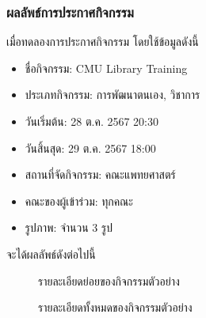 \subsubsection{ผลลัพธ์การประกาศกิจกรรม}
เมื่อทดลองการประกาศกิจกรรม โดยใช้ข้อมูลดังนี้
\begin{itemize}
    \item ชื่อกิจกรรม: CMU Library Training
    \item ประเภทกิจกรรม: การพัฒนาตนเอง, วิชาการ
    \item วันเริ่มต้น: 28 ต.ค. 2567 20:30
    \item วันสิ้นสุด: 29 ต.ค. 2567 18:00
    \item สถานที่จัดกิจกรรม: คณะแพทยศาสตร์
    \item คณะของผู้เข้าร่วม: ทุกคณะ
    \item รูปภาพ: จำนวน 3 รูป
\end{itemize}
จะได้ผลลัพธ์ดังต่อไปนี้
\begin{figure}[H]
    \begin{center}
    \end{center}
    \caption[ผลทดลองข้อมูลรายละเอียดย่อยของกิจกรรมตัวอย่าง]{รายละเอียดย่อยของกิจกรรมตัวอย่าง}
    \label{fig:test-create-box}
\end{figure}
\begin{figure}[H]
    \begin{center}
    \end{center}
    \caption[ผลทดลองข้อมูลรายละเอียดทั้งหมดของกิจกรรมตัวอย่าง]{รายละเอียดทั้งหมดของกิจกรรมตัวอย่าง}
    \label{fig:test-create-detail}
\end{figure}
